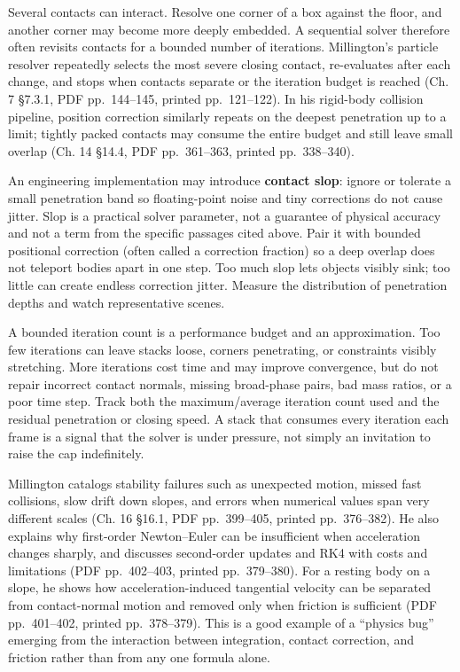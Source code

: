 Several contacts can interact. Resolve one corner of a box against the floor, and another corner may become more deeply embedded. A sequential solver therefore often revisits contacts for a bounded number of iterations. Millington's particle resolver repeatedly selects the most severe closing contact, re-evaluates after each change, and stops when contacts separate or the iteration budget is reached (Ch. 7 §7.3.1, PDF pp.~144--145, printed pp.~121--122). In his rigid-body collision pipeline, position correction similarly repeats on the deepest penetration up to a limit; tightly packed contacts may consume the entire budget and still leave small overlap (Ch. 14 §14.4, PDF pp.~361--363, printed pp.~338--340).

An engineering implementation may introduce \textbf{contact slop}: ignore or tolerate a small penetration band so floating-point noise and tiny corrections do not cause jitter. Slop is a practical solver parameter, not a guarantee of physical accuracy and not a term from the specific passages cited above. Pair it with bounded positional correction (often called a correction fraction) so a deep overlap does not teleport bodies apart in one step. Too much slop lets objects visibly sink; too little can create endless correction jitter. Measure the distribution of penetration depths and watch representative scenes.

A bounded iteration count is a performance budget and an approximation. Too few iterations can leave stacks loose, corners penetrating, or constraints visibly stretching. More iterations cost time and may improve convergence, but do not repair incorrect contact normals, missing broad-phase pairs, bad mass ratios, or a poor time step. Track both the maximum/average iteration count used and the residual penetration or closing speed. A stack that consumes every iteration each frame is a signal that the solver is under pressure, not simply an invitation to raise the cap indefinitely.

Millington catalogs stability failures such as unexpected motion, missed fast collisions, slow drift down slopes, and errors when numerical values span very different scales (Ch. 16 §16.1, PDF pp.~399--405, printed pp.~376--382). He also explains why first-order Newton--Euler can be insufficient when acceleration changes sharply, and discusses second-order updates and RK4 with costs and limitations (PDF pp.~402--403, printed pp.~379--380). For a resting body on a slope, he shows how acceleration-induced tangential velocity can be separated from contact-normal motion and removed only when friction is sufficient (PDF pp.~401--402, printed pp.~378--379). This is a good example of a ``physics bug'' emerging from the interaction between integration, contact correction, and friction rather than from any one formula alone.

